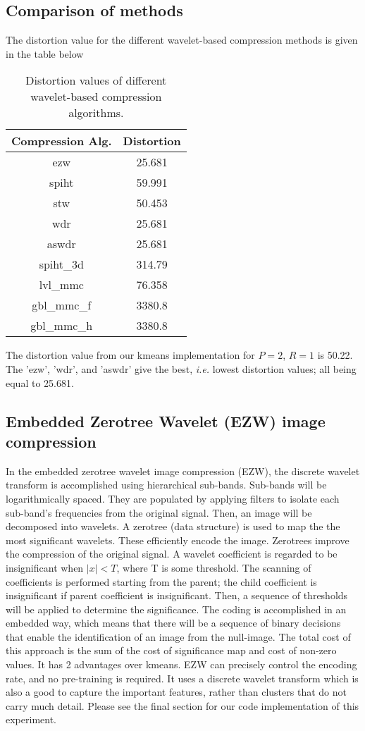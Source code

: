 \documentclass[]{../../ncmathy}
\begin{document}
\subsection{Comparison of methods}
The distortion value for the different wavelet-based compression methods is given in the table below 

	\begin{table}[H]
	\centering\makegapedcells
	\begin{tabular}{|| c c ||}
	\hline
	Compression Alg. & Distortion \\
	\hline
		ezw      &    25.681 \\
		spiht    &    59.991 \\
		stw      &   50.453 \\
		wdr      &    25.681 \\
		aswdr    &    25.681 \\ 
		spiht\_3d &    314.79 \\
		lvl\_mmc  &    76.358 \\ 
		gbl\_mmc\_f&    3380.8 \\ 
		gbl\_mmc\_h&    3380.8 \\
	\hline
	\end{tabular}
	\caption{Distortion values of different wavelet-based compression algorithms.}
	\end{table}

The distortion value from our kmeans implementation for $P=2$, $R = 1$ is 50.22. The 'ezw', 'wdr', and 'aswdr' give the best, \textit{i.e.} lowest distortion values; all being equal to 25.681. 

\subsection{Embedded Zerotree Wavelet (EZW) image compression}
	In the embedded zerotree wavelet image compression (EZW), the discrete wavelet transform is accomplished using hierarchical sub-bands. Sub-bands will be logarithmically spaced. They are populated by applying filters to isolate each sub-band's frequencies from the original signal. Then, an image will be decomposed into wavelets. A zerotree (data structure) is used to map the the most significant wavelets. These efficiently encode the image. Zerotrees improve the compression of the original signal. A wavelet coefficient is regarded to be insignificant when $|x| < T $, where T is some threshold. The scanning of coefficients is performed starting from the parent; the child coefficient is insignificant if parent coefficient is insignificant. Then, a sequence of thresholds will be applied to determine the significance. The coding is accomplished in an embedded way, which means that there will be a sequence of binary decisions that enable the identification of an image from the null-image. The total cost of this approach is the sum of the cost of significance map and cost of non-zero values. It has 2 advantages over kmeans. EZW can precisely control the encoding rate, and no pre-training is required. It uses a discrete wavelet transform which is also a good to capture the important features, rather than clusters that do not carry much detail. Please see the final section for our code implementation of this experiment.
\end{document}
